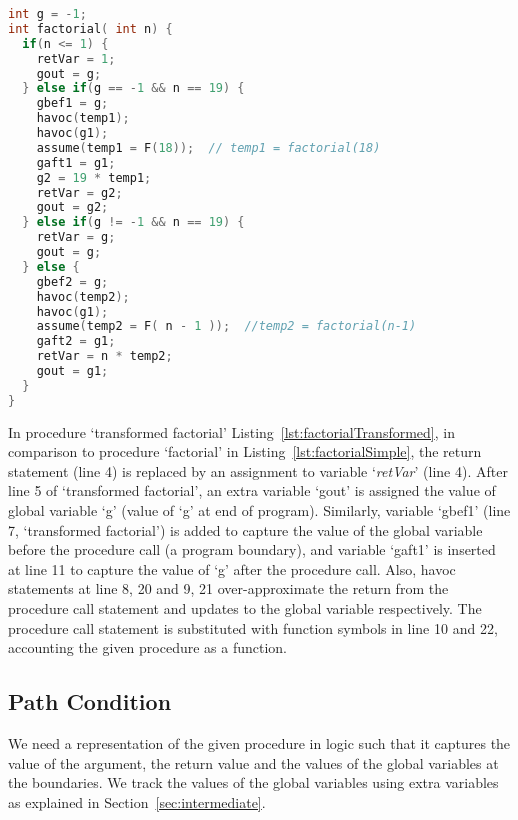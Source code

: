 \documentclass{llncs}
\newcommand{\foo}{\textit{foo}}
\newcommand{\pathCondition}{\mathit{T_{\foo}}}
\newcommand{\retVar}{\textit{retVar}}
\begin{document}
\begin{lstlisting}[language=c, caption= {Procedure `factorial' from
      Listing~\ref{lst:factorialSimple} converted to the form our
      approach expects. We refer to this procedure as `transformed
      factorial'.}, label=lst:factorialTransformed]
int g = -1;
int factorial( int n) {
  if(n <= 1) {
    retVar = 1;
    gout = g;
  } else if(g == -1 && n == 19) {
    gbef1 = g;
    havoc(temp1); 
    havoc(g1);
    assume(temp1 = F(18));  // temp1 = factorial(18)
    gaft1 = g1;
    g2 = 19 * temp1;
    retVar = g2;
    gout = g2;
  } else if(g != -1 && n == 19) {
    retVar = g;
    gout = g;
  } else {
    gbef2 = g;
    havoc(temp2);
    havoc(g1);
    assume(temp2 = F( n - 1 ));  //temp2 = factorial(n-1)
    gaft2 = g1;
    retVar = n * temp2;
    gout = g1;
  }
}
\end{lstlisting}

In procedure `transformed factorial'
Listing~\ref{lst:factorialTransformed}, in comparison to procedure
`factorial' in Listing~\ref{lst:factorialSimple}, the return statement
(line 4) is replaced by an assignment to variable `\retVar' (line
4). After line 5 of `transformed factorial', an extra variable `gout'
is assigned the value of global variable `g' (value of `g' at end of
program).  Similarly, variable `gbef1' (line 7, `transformed
factorial') is added to capture the value of the global variable
before the procedure call (a program boundary), and variable `gaft1'
is inserted at line 11 to capture the value of `g' after the procedure
call. Also, havoc statements at line 8, 20 and 9, 21 over-approximate
the return from the procedure call statement and updates to the global
variable respectively. The procedure call statement is substituted
with function symbols in line 10 and 22, accounting the given
procedure as a function.

\subsection{Path Condition}

We need a representation of the given procedure in logic such that it
captures the value of the argument, the return value and the values of
the global variables at the boundaries. We track the values of the
global variables using extra variables as explained in
Section~\ref{sec:intermediate}.
\end{document}
